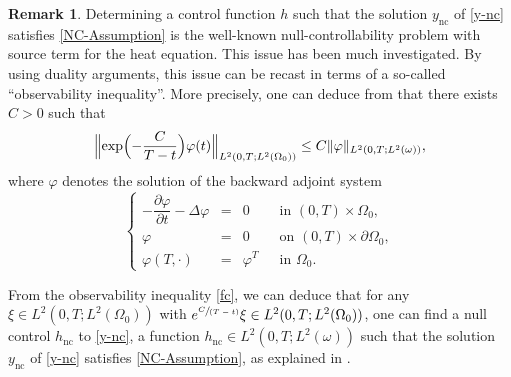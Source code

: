 \documentclass[10pt,a4paper]{amsart}
\newcommand{\spfrac}[2]{\sfrac{#1}{(#2)}}
\newcommand{\nc}{\mathrm{nc}}
\newcommand{\Bnorm}[1]{\Bigl\Vert#1\Bigr\Vert}
\theoremstyle{definition}
\newtheorem{remark}[theorem]{Remark}
\begin{document}
\begin{remark}
Determining a control function $h$ such that the solution $y_{\nc}$ of \eqref{y-nc} satisfies \eqref{NC-Assumption} is the well-known null-controllability problem with source term for the heat equation. This issue has been much investigated. By using duality arguments, this issue can be recast in terms of a so-called ``observability inequality''. More precisely, one can deduce from \cite[Lem.\,2.1]{FursikovImanuvilov} that there exists $C>0$ such that
\begin{equation}\label{fc}
\Bnorm{\exp\Bigl(- \frac{C}{T-t}\Bigr)\varphi(t)}_ {L^2(0,T; L^2(\Omega_0))} \leq C \| \varphi \|_{L^2(0,T; L^2(\omega))},
\end{equation}
where $\varphi$ denotes the solution of the backward adjoint system
\begin{equation*}
\left\{
\begin{array}{rcll}
-\dfrac{\partial \varphi}{\partial t}-\Delta \varphi &=&0 \quad&\text{ in }(0,T) \times \Omega_0,
\\
\varphi &=& 0 &\text{ on }(0,T) \times \partial \Omega_0,
\\
\varphi\left(T,\cdot\right) &=& \varphi^T &\text{ in }\Omega_0.
\end{array}
\right.
\end{equation*}

From the observability inequality \eqref{fc}, we can deduce that for any $\xi\in L^2(0,T; L^2(\Omega_0))$ with $e^{\spfrac{C}{T-t}}\xi \in L^2(0,T; L^2(\Omega_0))$, one can find a null control $h_{\nc}$ to \eqref{y-nc}, \ie a function $h_{\nc} \in L^2(0,T; L^2(\omega))$ such that the solution $y_{\nc}$ of \eqref{y-nc} satisfies \eqref{NC-Assumption}, as explained in \cite[Proof of Th.\,2.1]{FursikovImanuvilov}.
\end{remark}
\end{document}
